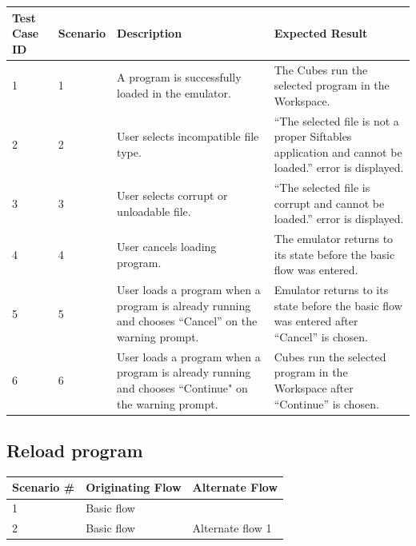 \documentclass[12pt]{article}
\begin{document}
\begin{table}[h!]
  \begin{tabular}{p{.5in} | p{.75in} | p{2.15in} | p{2.15in}}
    \textbf{Test Case ID} &
    \textbf{Scenario} &
    \textbf{Description} &
    \textbf{Expected Result} \\ \hline

    1 &
    1 &
    A program is successfully loaded in the emulator. &
    The Cubes run the selected program in the Workspace. \\ \hline

    2 &
    2 &
    User selects incompatible file type. &
    ``The selected file is not a proper Siftables application and cannot be loaded.'' error is displayed. \\ \hline

    3 &
    3 &
    User selects corrupt or unloadable file. &
    ``The selected file is corrupt and cannot be loaded.'' error is displayed. \\ \hline

    4 &
    4 &
    User cancels loading program. &
    The emulator returns to its state before the basic flow was entered. \\ \hline

    5 &
    5 &
    User loads a program when a program is already running and chooses ``Cancel'' on the warning prompt. &
    Emulator returns to its state before the basic flow was entered after ``Cancel'' is chosen. \\ \hline

    6 &
    6 &
    User loads a program when a program is already running and chooses ``Continue" on the warning prompt. &
    Cubes run the selected program in the Workspace after ``Continue'' is chosen. \\ \hline
  \end{tabular}
\end{table}
\clearpage

\subsection{Reload program}

\begin{table}[h!]
  \begin{tabular}{l | l | l}
    \textbf{Scenario \#} &
    \textbf{Originating Flow} &
    \textbf{Alternate Flow} \\ \hline

    1 &
    Basic flow &
    \\ \hline

    2 &
    Basic flow &
    Alternate flow 1 \\ \hline

  \end{tabular}
\end{table}
\end{document}
